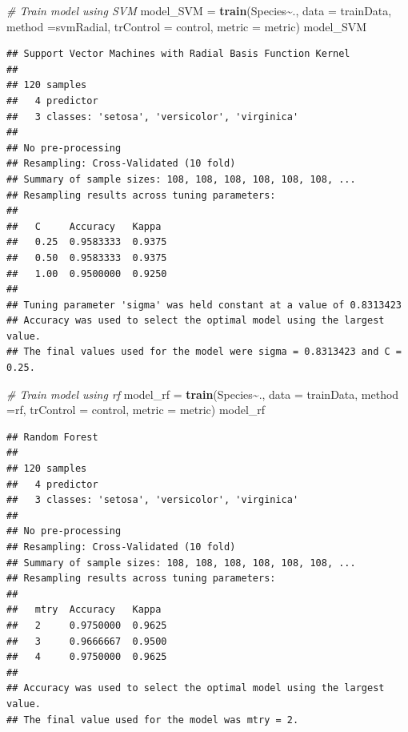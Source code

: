 \documentclass[
]{article}
\newenvironment{Shaded}{\begin{snugshade}}{\end{snugshade}}
\newcommand{\AttributeTok}[1]{\textcolor[rgb]{0.13,0.29,0.53}{#1}}
\newcommand{\CommentTok}[1]{\textcolor[rgb]{0.56,0.35,0.01}{\textit{#1}}}
\newcommand{\FunctionTok}[1]{\textcolor[rgb]{0.13,0.29,0.53}{\textbf{#1}}}
\newcommand{\NormalTok}[1]{#1}
\newcommand{\OtherTok}[1]{\textcolor[rgb]{0.56,0.35,0.01}{#1}}
\newcommand{\SpecialCharTok}[1]{\textcolor[rgb]{0.81,0.36,0.00}{\textbf{#1}}}
\newcommand{\StringTok}[1]{\textcolor[rgb]{0.31,0.60,0.02}{#1}}
\begin{document}
\begin{Shaded}
\begin{Highlighting}[]
\CommentTok{\# Train model using SVM}
\NormalTok{model\_SVM }\OtherTok{=} \FunctionTok{train}\NormalTok{(Species}\SpecialCharTok{\textasciitilde{}}\NormalTok{., }\AttributeTok{data =}\NormalTok{ trainData, }\AttributeTok{method =}\StringTok{\textquotesingle{}svmRadial\textquotesingle{}}\NormalTok{, }\AttributeTok{trControl =}\NormalTok{ control, }\AttributeTok{metric =}\NormalTok{ metric)}
\NormalTok{model\_SVM}
\end{Highlighting}
\end{Shaded}

\begin{verbatim}
## Support Vector Machines with Radial Basis Function Kernel 
## 
## 120 samples
##   4 predictor
##   3 classes: 'setosa', 'versicolor', 'virginica' 
## 
## No pre-processing
## Resampling: Cross-Validated (10 fold) 
## Summary of sample sizes: 108, 108, 108, 108, 108, 108, ... 
## Resampling results across tuning parameters:
## 
##   C     Accuracy   Kappa 
##   0.25  0.9583333  0.9375
##   0.50  0.9583333  0.9375
##   1.00  0.9500000  0.9250
## 
## Tuning parameter 'sigma' was held constant at a value of 0.8313423
## Accuracy was used to select the optimal model using the largest value.
## The final values used for the model were sigma = 0.8313423 and C = 0.25.
\end{verbatim}

\begin{Shaded}
\begin{Highlighting}[]
\CommentTok{\# Train model using rf}
\NormalTok{model\_rf }\OtherTok{=} \FunctionTok{train}\NormalTok{(Species}\SpecialCharTok{\textasciitilde{}}\NormalTok{., }\AttributeTok{data =}\NormalTok{ trainData, }\AttributeTok{method =}\StringTok{\textquotesingle{}rf\textquotesingle{}}\NormalTok{, }\AttributeTok{trControl =}\NormalTok{ control, }\AttributeTok{metric =}\NormalTok{ metric)}
\NormalTok{model\_rf}
\end{Highlighting}
\end{Shaded}

\begin{verbatim}
## Random Forest 
## 
## 120 samples
##   4 predictor
##   3 classes: 'setosa', 'versicolor', 'virginica' 
## 
## No pre-processing
## Resampling: Cross-Validated (10 fold) 
## Summary of sample sizes: 108, 108, 108, 108, 108, 108, ... 
## Resampling results across tuning parameters:
## 
##   mtry  Accuracy   Kappa 
##   2     0.9750000  0.9625
##   3     0.9666667  0.9500
##   4     0.9750000  0.9625
## 
## Accuracy was used to select the optimal model using the largest value.
## The final value used for the model was mtry = 2.
\end{verbatim}
\end{document}
